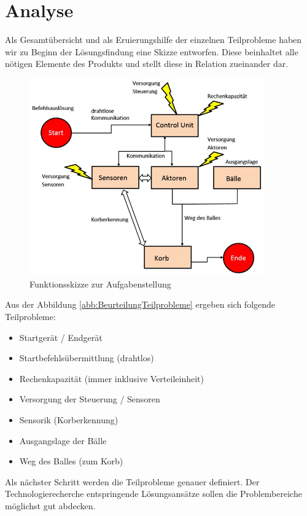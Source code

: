 \section{Analyse}
	Als Gesamtübersicht und als Eruierungshilfe der einzelnen Teilprobleme haben wir zu Beginn der Lösungsfindung eine Skizze entworfen. Diese beinhaltet alle nötigen Elemente des Produkts und stellt diese in Relation zueinander dar. 
	
	\begin{figure}[h!]
		\includegraphics[width=0.9\textwidth]{Morphologie/Bilder/Blockschaltbild.jpg}
		\centering
		\caption{Funktionsskizze zur Aufgabenstellung}
		\label{abb:Blockschaltbild} 
	\end{figure}
	
	Aus der Abbildung \ref{abb:BeurteilungTeilprobleme} ergeben sich folgende Teilprobleme:
	\begin{itemize}
		\item Startgerät / Endgerät
		\item Startbefehlsübermittlung (drahtlos)
		\item Rechenkapazität (immer inklusive Verteileinheit)
		\item Versorgung der Steuerung / Sensoren
		\item Sensorik (Korberkennung)
		\item Ausgangslage der Bälle
		\item Weg des Balles (zum Korb)
	\end{itemize}
	Als nächster Schritt werden die Teilprobleme genauer definiert. Der Technologierecherche entspringende Lösungsansätze sollen die Problembereiche möglichst gut abdecken.
	
